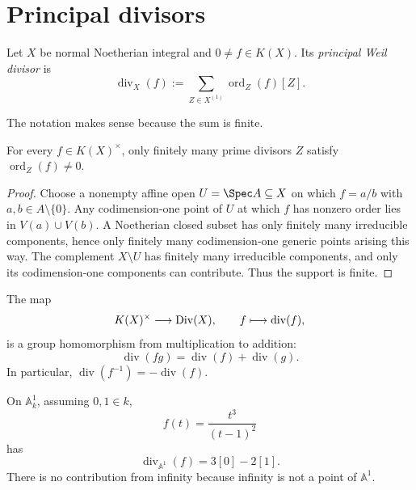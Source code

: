 \section{Principal divisors}
\begin{definition}\label{def:vi39-principal}
Let \(X\) be normal Noetherian integral and \(0\ne f\in K(X)\).  Its \emph{principal Weil divisor} is
\[
 \operatorname{div}_X(f)
 :=\sum_{Z\in X^{(1)}}\operatorname{ord}_Z(f)[Z].
\]
\end{definition}

The notation makes sense because the sum is finite.

\begin{theorem}\label{thm:vi39-finite-support}
For every \(f\in K(X)^\times\), only finitely many prime divisors \(Z\) satisfy \(\operatorname{ord}_Z(f)\ne0\).
\end{theorem}

\begin{proof}
Choose a nonempty affine open \(U=\Spec A\subseteq X\) on which \(f=a/b\) with \(a,b\in A\setminus\{0\}\).  Any codimension-one point of \(U\) at which \(f\) has nonzero order lies in \(V(a)\cup V(b)\).  A Noetherian closed subset has only finitely many irreducible components, hence only finitely many codimension-one generic points arising this way.  The complement \(X\setminus U\) has finitely many irreducible components, and only its codimension-one components can contribute.  Thus the support is finite.
\end{proof}

\begin{proposition}\label{prop:vi39-principal-hom}
The map
\[
 K(X)^\times\longrightarrow\operatorname{Div}(X),
 \qquad f\longmapsto\operatorname{div}(f),
\]
is a group homomorphism from multiplication to addition:
\[
 \operatorname{div}(fg)=\operatorname{div}(f)+\operatorname{div}(g).
\]
In particular, \(\operatorname{div}(f^{-1})=-\operatorname{div}(f)\).
\end{proposition}

\begin{example}\label{ex:vi39-affine-rational}
On \(\mathbb{A}^1_k\), assuming \(0,1\in k\),
\[
 f(t)=\frac{t^3}{(t-1)^2}
\]
has
\[
 \operatorname{div}_{\mathbb{A}^1}(f)=3[0]-2[1].
\]
There is no contribution from infinity because infinity is not a point of \(\mathbb{A}^1\).
\end{example}

